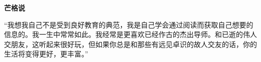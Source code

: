 \renewcommand{\bookchapter}{书单5}
\cleardoublepage
{}

\textbf{芒格说}
\par

\begin{MungerSaysBox}
{\kaishu “我想我自己不是受到良好教育的典范，我是自己学会通过阅读而获取自己想要的信息的。我一生中常常如此。我经常是更喜欢已经作古的杰出导师。和已逝的伟人交朋友，这听起来很好玩，但如果你总是和那些有远见卓识的故人交友的话，你的生活将变得更好，更丰富。”}
\par
\end{MungerSaysBox}

\cleardoublepage









